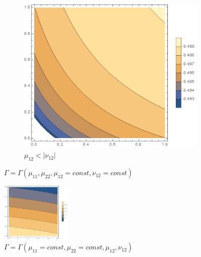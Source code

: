 \documentclass[12pt,a4]{article}
\begin{document}
\begin{figure}[!ht]
	\hfill
	\begin{subfigure}[b]{0.3\textwidth}
		\centering
		\includegraphics[width=\textwidth]{Joonised/GammaMu11Mu22III}
		\caption{$ \mu_{12} < | \nu_{12}| $}
	\end{subfigure}
	\caption{$ \Gamma = \Gamma (\mu_{11}, \mu_{22}, \mu_{12} = const, \nu_{12} = const) $}
\end{figure}
\begin{figure}[!ht]
	\centering
	\includegraphics[width=0.3\textwidth]{Joonised/GammaMu12Nu12}
	\caption{$ \Gamma = \Gamma (\mu_{11} = const, \mu_{22} = const, \mu_{12}, \nu_{12}) $}
\end{figure}
\end{document}

